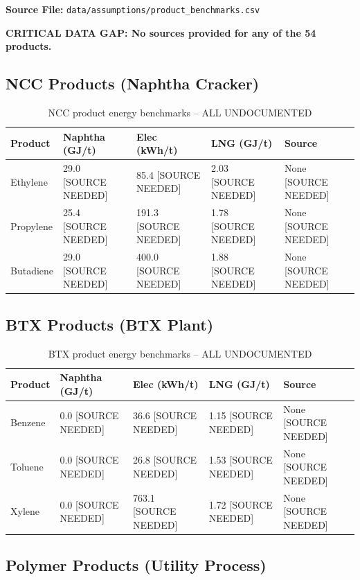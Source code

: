 \documentclass[12pt,a4paper]{article}
\newcommand{\nosource}[1]{\textcolor{sourcered}{#1 [SOURCE NEEDED]}}
\begin{document}
\textbf{Source File:} \texttt{data/assumptions/product\_benchmarks.csv}

\textbf{\textcolor{sourcered}{CRITICAL DATA GAP: No sources provided for any of the 54 products.}}

\subsection{NCC Products (Naphtha Cracker)}

\begin{table}[H]
\centering
\begin{tabular}{lllll}
\toprule
\textbf{Product} & \textbf{Naphtha (GJ/t)} & \textbf{Elec (kWh/t)} & \textbf{LNG (GJ/t)} & \textbf{Source} \\
\midrule
Ethylene & \nosource{29.0} & \nosource{85.4} & \nosource{2.03} & \nosource{None} \\
Propylene & \nosource{25.4} & \nosource{191.3} & \nosource{1.78} & \nosource{None} \\
Butadiene & \nosource{29.0} & \nosource{400.0} & \nosource{1.88} & \nosource{None} \\
\bottomrule
\end{tabular}
\caption{NCC product energy benchmarks -- \textcolor{sourcered}{ALL UNDOCUMENTED}}
\end{table}

\subsection{BTX Products (BTX Plant)}

\begin{table}[H]
\centering
\begin{tabular}{lllll}
\toprule
\textbf{Product} & \textbf{Naphtha (GJ/t)} & \textbf{Elec (kWh/t)} & \textbf{LNG (GJ/t)} & \textbf{Source} \\
\midrule
Benzene & \nosource{0.0} & \nosource{36.6} & \nosource{1.15} & \nosource{None} \\
Toluene & \nosource{0.0} & \nosource{26.8} & \nosource{1.53} & \nosource{None} \\
Xylene & \nosource{0.0} & \nosource{763.1} & \nosource{1.72} & \nosource{None} \\
\bottomrule
\end{tabular}
\caption{BTX product energy benchmarks -- \textcolor{sourcered}{ALL UNDOCUMENTED}}
\end{table}

\subsection{Polymer Products (Utility Process)}
\end{document}
